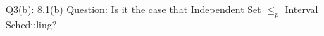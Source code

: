 \begin{problem}
  {Q3(b): 8.1(b)}
  Question: Is it the case that Independent Set $\leq_{p}$ Interval Scheduling?
\end{problem}
